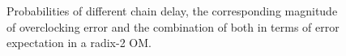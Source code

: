 \documentclass{acm_proc_article-sp}
\begin{document}
\begin{figure}[t]
{\begin{minipage}{0.24\textwidth}
  \end{minipage}
  }\vspace{-2ex}
  \vspace{-3ex}
  \caption{Probabilities of different chain delay, the corresponding magnitude of overclocking error and the combination of both in terms of error expectation in a radix-2 OM.}
  \label{Fig:Probability_Error_Mean}
  \vspace{-2ex}
\end{figure}
\end{document}
